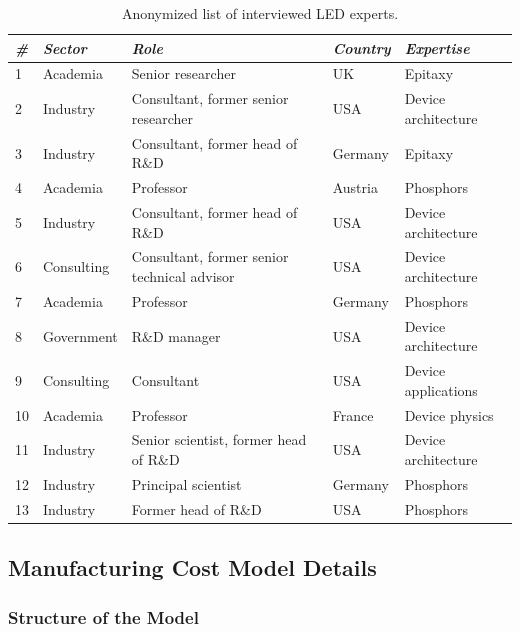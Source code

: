 \documentclass[parskip=full]{article}
\begin{document}
\begin{table}[H]
\small
    \centering
    \caption{Anonymized list of interviewed LED experts.}
    \vspace{5mm}
    \begin{tabular}{|l|l|l|l|l|}
    \hline
        \textit{\#} & \textit{Sector} & \textit{Role} & \textit{Country} & \textit{Expertise} \\ \hline
        1 & Academia & Senior researcher & UK & Epitaxy \\ \hline
        2 & Industry & Consultant, former senior researcher & USA & Device architecture \\ \hline
        3 & Industry & Consultant, former head of R\&D & Germany & Epitaxy \\ \hline
        4 & Academia & Professor & Austria & Phosphors \\ \hline
        5 & Industry & Consultant, former head of R\&D & USA & Device architecture \\ \hline
        6 & Consulting & Consultant, former senior technical advisor & USA & Device architecture \\ \hline
        7 & Academia & Professor & Germany & Phosphors \\ \hline
        8 & Government & R\&D manager & USA & Device architecture \\ \hline
        9 & Consulting & Consultant & USA & Device applications \\ \hline
        10 & Academia & Professor & France & Device physics \\ \hline
        11 & Industry & Senior scientist, former head of R\&D & USA & Device architecture \\ \hline
        12 & Industry & Principal scientist & Germany & Phosphors \\ \hline
        13 & Industry & Former head of R\&D & USA & Phosphors \\ \hline
    \end{tabular}
    \label{tab:interviews}
\end{table}

\subsection{Manufacturing Cost Model Details}
\label{sec:costmodel_details}

\subsubsection{Structure of the Model}
\end{document}
